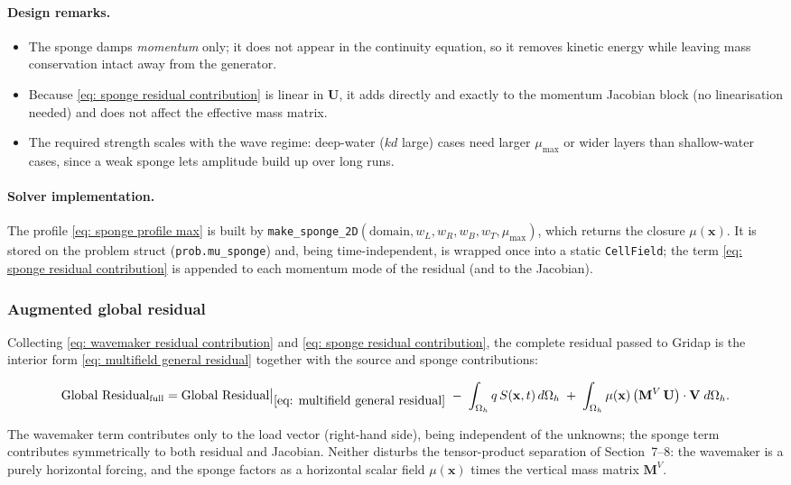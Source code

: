 \documentclass{article}
\newcommand{\VmM}{\mathbf{M}^V}
\newcommand{\Oh}{\Omega_h}
\begin{document}
\paragraph{Design remarks.}
\begin{itemize}
    \item The sponge damps \emph{momentum} only; it does not appear in the continuity equation, so it
    removes kinetic energy while leaving mass conservation intact away from the generator.
    \item Because \eqref{eq: sponge residual contribution} is linear in $\mathbf{U}$, it adds directly
    and exactly to the momentum Jacobian block (no linearisation needed) and does not affect the
    effective mass matrix.
    \item The required strength scales with the wave regime: deep-water ($kd$ large) cases need larger
    $\mu_{\max}$ or wider layers than shallow-water cases, since a weak sponge lets amplitude build up
    over long runs.
\end{itemize}

\paragraph{Solver implementation.} The profile \eqref{eq: sponge profile max} is built by
\texttt{make\_sponge\_2D}$(\text{domain}, w_L, w_R, w_B, w_T, \mu_{\max})$, which returns the closure
$\mu(\mathbf{x})$. It is stored on the problem struct (\texttt{prob.mu\_sponge}) and, being
time-independent, is wrapped once into a static \texttt{CellField}; the term
\eqref{eq: sponge residual contribution} is appended to each momentum mode of the residual (and to the
Jacobian).

\subsubsection*{Augmented global residual}

Collecting \eqref{eq: wavemaker residual contribution} and
\eqref{eq: sponge residual contribution}, the complete residual passed to Gridap is the interior form
\eqref{eq: multifield general residual} together with the source and sponge contributions:
\begin{framed}
    \begin{multline}
        \text{Global Residual}_{\text{full}} = \text{Global Residual}\big|_{\eqref{eq: multifield general residual}}
        \;-\; \int_{\Oh} q\, S(\mathbf{x},t)\, d\Oh
        \;+\; \int_{\Oh} \mu(\mathbf{x})\left(\VmM\,\mathbf{U}\right)\cdot\mathbf{V}\; d\Oh .
        \label{eq: augmented global residual}
    \end{multline}
\end{framed}
The wavemaker term contributes only to the load vector (right-hand side), being independent of the
unknowns; the sponge term contributes symmetrically to both residual and Jacobian. Neither disturbs
the tensor-product separation of Section~7--8: the wavemaker is a purely horizontal forcing, and the
sponge factors as a horizontal scalar field $\mu(\mathbf{x})$ times the vertical mass matrix $\VmM$.
\end{document}
